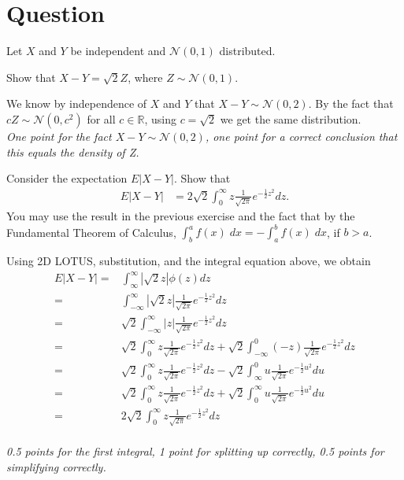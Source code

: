 \section{Question}

Let $X$ and $Y$ be independent and $\mathcal{N}(0,1)$ distributed.
\begin{exercise}[1]
Show that $X-Y = \sqrt{2}Z$, where $Z \sim \mathcal{N}(0,1)$.
\begin{solution}
    We know by independence of $X$ and $Y$ that $X-Y \sim \mathcal{N}(0,2)$. By the fact that $cZ \sim \mathcal{N}(0,c^2)$ for all $c \in \mathbb{R}$, using $c = \sqrt{2}$ we get the same distribution. \\
    \textit{One point for the fact $X-Y \sim \mathcal{N}(0,2)$, one point for a correct conclusion that this equals the density of Z.}
\end{solution}
\end{exercise}

\begin{exercise}[2]
Consider the expectation $E|X-Y|$. Show that
\begin{align*}
    E|X-Y| &= 2 \sqrt{2} \int_{0}^\infty z \frac{1}{\sqrt{2 \pi}} e^{-\frac{1}{2}z^2} dz.
\end{align*}
You may use the result in the previous exercise and the fact that by the Fundamental Theorem of Calculus, $\int_b^a f(x) \;dx = -\int_a^b f(x) \;dx$, if $b > a$.
\begin{solution}
    Using 2D LOTUS, substitution, and the integral equation above, we obtain
    \begin{align*}
     E|X-Y| =& \int_{\infty}^\infty |\sqrt{2}z| \phi(z) dz \\
     =& \int_{-\infty}^\infty |\sqrt{2}z| \frac{1}{\sqrt{2 \pi}} e^{-\frac{1}{2}z^2} dz \\
     =& \sqrt{2} \int_{-\infty}^\infty |z| \frac{1}{\sqrt{2 \pi}} e^{-\frac{1}{2}z^2} dz \\
     =& \sqrt{2} \int_{0}^\infty z \frac{1}{\sqrt{2 \pi}} e^{-\frac{1}{2}z^2} dz + \sqrt{2} \int_{-\infty}^0 (-z) \frac{1}{\sqrt{2 \pi}} e^{-\frac{1}{2}z^2} dz \\
     =& \sqrt{2} \int_{0}^\infty z \frac{1}{\sqrt{2 \pi}} e^{-\frac{1}{2}z^2} dz - \sqrt{2} \int_{\infty}^0 u \frac{1}{\sqrt{2 \pi}} e^{-\frac{1}{2}u^2} du \\
     =& \sqrt{2} \int_{0}^\infty z \frac{1}{\sqrt{2 \pi}} e^{-\frac{1}{2}z^2} dz + \sqrt{2} \int_{0}^\infty u \frac{1}{\sqrt{2 \pi}} e^{-\frac{1}{2}u^2} du \\
     =& 2 \sqrt{2} \int_{0}^\infty z \frac{1}{\sqrt{2 \pi}} e^{-\frac{1}{2}z^2} dz
    \end{align*} \\
    \textit{0.5 points for the first integral, 1 point for splitting up correctly, 0.5 points for simplifying correctly.}
\end{solution}
\end{exercise}

